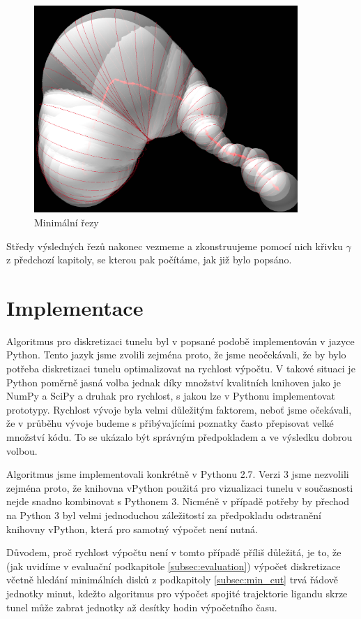 \begin{figure}[ht]
    \centering
    \includegraphics[width=100mm]{img/min_cuts.png}
    \caption{Minimální řezy}
  \centering
  \label{fig:min_cuts}
\end{figure}

Středy výsledných řezů nakonec vezmeme a zkonstruujeme pomocí nich křivku
$ \gamma $ z předchozí kapitoly, se kterou pak počítáme, jak již bylo popsáno.

\section{Implementace} \label{subsec:implementation}
Algoritmus pro diskretizaci tunelu byl v popsané podobě implementován v
jazyce Python. Tento jazyk jsme zvolili zejména proto, že jsme neočekávali, že
by bylo potřeba diskretizaci tunelu optimalizovat na rychlost výpočtu. V takové
situaci je Python poměrně jasná volba jednak díky množství kvalitních
knihoven jako je NumPy a SciPy a druhak pro rychlost, s jakou lze v Pythonu
implementovat prototypy. Rychlost vývoje byla velmi důležitým faktorem, neboť
jsme očekávali, že v průběhu vývoje budeme s přibývajícími poznatky často
přepisovat velké množství kódu. To se ukázalo být správným předpokladem
a ve výsledku dobrou volbou.

Algoritmus jsme implementovali konkrétně v Pythonu 2.7. Verzi 3 jsme nezvolili
zejména proto, že knihovna vPython použitá pro vizualizaci tunelu v současnosti
nejde snadno kombinovat s Pythonem 3. Nicméně v případě potřeby by přechod na
Python 3 byl velmi jednoduchou záležitostí za předpokladu odstranění knihovny
vPython, která pro samotný výpočet není nutná.

Důvodem, proč rychlost výpočtu není v tomto případě příliš důležitá, je to, že
(jak uvidíme v evaluační podkapitole \ref{subsec:evaluation}) výpočet diskretizace
včetně hledání minimálních disků z podkapitoly \ref{subsec:min_cut} trvá řádově
jednotky minut, kdežto algoritmus pro výpočet spojité trajektorie ligandu skrze
tunel může zabrat jednotky až desítky hodin výpočetního času.

